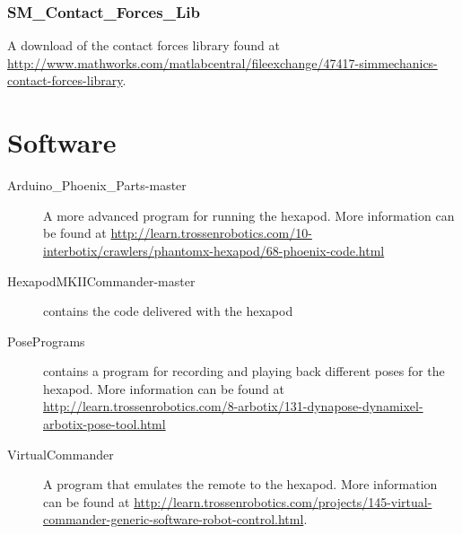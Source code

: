 \documentclass[letterpaper, 10 pt]{report}
\begin{document}
\subsubsection{SM{\_}Contact{\_}Forces{\_}Lib}

A download of the contact forces library found at \url{http://www.mathworks.com/matlabcentral/fileexchange/47417-simmechanics-contact-forces-library}.



\section{Software}

\begin{description}
\item[Arduino{\_}Phoenix{\_}Parts-master] A more advanced program for running the  hexapod. 
More information can be found at 
\url{http://learn.trossenrobotics.com/10-interbotix/crawlers/phantomx-hexapod/68-phoenix-code.html}
\item[HexapodMKIICommander-master] contains the code delivered with the hexapod
\item[PosePrograms] contains a program for recording and playing back different poses for the hexapod.
More information can be found at 
\url{http://learn.trossenrobotics.com/8-arbotix/131-dynapose-dynamixel-arbotix-pose-tool.html}
\item[VirtualCommander] A program that emulates the remote to the hexapod.
More information can be found at 
\url{http://learn.trossenrobotics.com/projects/145-virtual-commander-generic-software-robot-control.html}.
\end{description}



%

\end{document}
